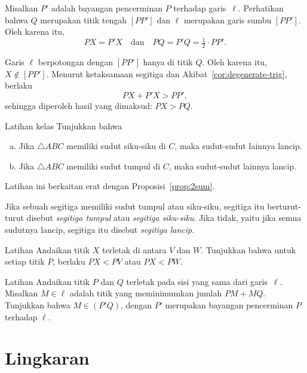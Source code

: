 Misalkan $P'$ adalah bayangan pencerminan $P$ terhadap garis~$\ell$.
Perhatikan bahwa $Q$ merupakan titik tengah $[PP']$
dan $\ell$ merupakan garis sumbu $[PP']$.
Oleh karena itu,
$$PX=P'X
\quad
\text{dan}
\quad
PQ=P'Q=\tfrac12\cdot PP'.$$

Garis $\ell$ berpotongan dengan $[PP']$ hanya di titik $Q$.
Oleh karena itu, $X\notin [PP']$.
Menurut ketaksamaan segitiga dan Akibat~\ref{cor:degenerate-trig}, berlaku
$$PX+P'X>PP',$$
sehingga diperoleh hasil yang dimaksud: $PX>PQ$.
\qeds

\begin{thm}{Latihan kelas}\label{ex:right-acute}
Tunjukkan bahwa
\begin{enumerate}[(a)]
\item Jika $\triangle ABC$ memiliki sudut siku-siku di $C$, maka sudut-sudut lainnya lancip.
\item Jika $\triangle ABC$ memiliki sudut tumpul di $C$, maka sudut-sudut lainnya lancip.
\end{enumerate}
\end{thm}

Latihan ini berkaitan erat dengan Proposisi~\ref{prop:2sum}.

Jika sebuah segitiga memiliki sudut tumpul atau siku-siku, segitiga itu berturut-turut disebut \emph{segitiga tumpul} atau \emph{segitiga siku-siku}.
Jika tidak, yaitu jika semua sudutnya lancip, segitiga itu disebut \emph{segitiga lancip}.

\begin{thm}[!]{Latihan}\label{ex:obtuce}
Andaikan titik $X$ terletak di antara $V$ dan $W$.
Tunjukkan bahwa untuk setiap titik $P$, berlaku $PX < PV$ atau $PX < PW$.
\end{thm}

\begin{thm}{Latihan}\label{ex:PMQ}
Andaikan titik $P$ dan $Q$ terletak pada sisi yang sama dari garis~$\ell$.
Misalkan $M\in \ell$ adalah titik yang meminimumkan jumlah $PM+MQ$.
Tunjukkan bahwa $M\in (P'Q)$, dengan $P'$ merupakan bayangan pencerminan $P$ terhadap $\ell$.
\end{thm}



\section{Lingkaran}

